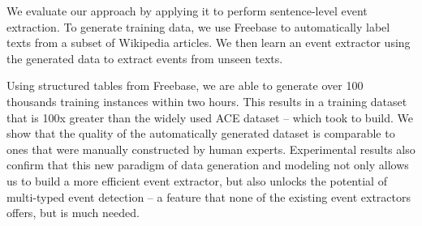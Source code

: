 We evaluate our approach by  applying it to perform sentence-level event extraction. To generate training data, we use Freebase to
automatically label texts from a subset of Wikipedia articles. We then learn an event extractor using the generated data  to extract events
from unseen texts.

Using  structured tables from Freebase, we are able to generate over 100 thousands training instances within two hours. This
results in a training dataset that is 100x greater than the widely used ACE dataset -- which took  to
build\FIXME{~\cite{}}. We show that the quality of the automatically generated dataset is comparable to ones that were manually constructed
by human experts. Experimental results also confirm that this new paradigm of data generation and modeling not only allows us to build a
more efficient event extractor, but also unlocks the potential of multi-typed event detection -- a feature that none of the existing event
extractors offers, but is much needed.








